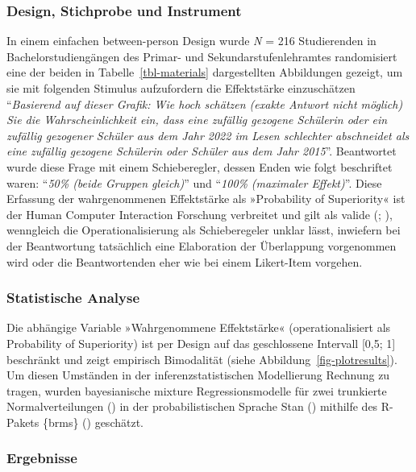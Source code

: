 \documentclass[
  jou,
  floatsintext,
  longtable,
  nolmodern,
  notxfonts,
  notimes,
  colorlinks=true,linkcolor=blue,citecolor=blue,urlcolor=blue]{apa7}
\begin{document}
\subsubsection{Design, Stichprobe und
Instrument}\label{design-stichprobe-und-instrument}

In einem einfachen between-person Design wurde \emph{N} = 216
Studierenden in Bachelorstudiengängen des Primar- und
Sekundarstufenlehramtes randomisiert eine der beiden in
Tabelle~\ref{tbl-materials} dargestellten Abbildungen gezeigt, um sie
mit folgenden Stimulus aufzufordern die Effektstärke einzuschätzen
``\emph{Basierend auf dieser Grafik: Wie hoch schätzen (exakte Antwort
nicht möglich) Sie die Wahrscheinlichkeit ein, dass eine zufällig
gezogene Schülerin oder ein zufällig gezogener Schüler aus dem Jahr 2022
im Lesen schlechter abschneidet als eine zufällig gezogene Schülerin
oder Schüler aus dem Jahr 2015}''. Beantwortet wurde diese Frage mit
einem Schieberegler, dessen Enden wie folgt beschriftet waren:
``\emph{50\% (beide Gruppen gleich)}'' und ``\emph{100\%}
\emph{(maximaler Effekt)}''. Diese Erfassung der wahrgenommenen
Effektstärke als »Probability of Superiority« ist der Human Computer
Interaction Forschung verbreitet und gilt als valide
(;
), wenngleich die
Operationalisierung als Schieberegeler unklar lässt, inwiefern bei der
Beantwortung tatsächlich eine Elaboration der Überlappung vorgenommen
wird oder die Beantwortenden eher wie bei einem Likert-Item vorgehen.

\subsubsection{Statistische Analyse}\label{statistische-analyse}

Die abhängige Variable »Wahrgenommene Effektstärke« (operationalisiert
als Probability of Superiority) ist per Design auf das geschlossene
Intervall {[}0,5; 1{]} beschränkt und zeigt empirisch Bimodalität (siehe
Abbildung~\ref{fig-plotresults}). Um diesen Umständen in der
inferenzstatistischen Modellierung Rechnung zu tragen, wurden
bayesianische mixture Regressionsmodelle für zwei trunkierte
Normalverteilungen () in der probabilistischen Sprache Stan
()
mithilfe des R-Pakets \{brms\} () geschätzt.

\subsubsection{Ergebnisse}\label{ergebnisse}
\end{document}
